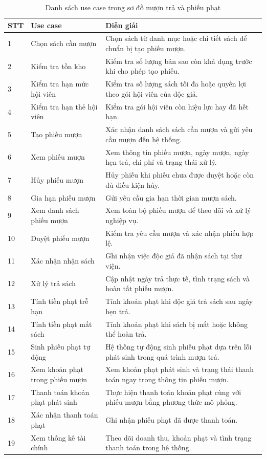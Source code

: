 \documentclass[../main.tex]{subfiles}
\begin{document}
\begin{longtable}{|p{1cm}|p{4cm}|p{8cm}|}
\caption{Danh sách use case trong sơ đồ mượn trả và phiếu phạt}\\
\hline
\textbf{STT} & \textbf{Use case} & \textbf{Diễn giải} \\
\hline
1 & Chọn sách cần mượn & Chọn sách từ danh mục hoặc chi tiết sách để chuẩn bị tạo phiếu mượn. \\
\hline
2 & Kiểm tra tồn kho & Kiểm tra số lượng bản sao còn khả dụng trước khi cho phép tạo phiếu. \\
\hline
3 & Kiểm tra hạn mức hội viên & Kiểm tra số lượng sách tối đa hoặc quyền lợi theo gói hội viên của độc giả. \\
\hline
4 & Kiểm tra hạn thẻ hội viên & Kiểm tra gói hội viên còn hiệu lực hay đã hết hạn. \\
\hline
5 & Tạo phiếu mượn & Xác nhận danh sách sách cần mượn và gửi yêu cầu mượn đến hệ thống. \\
\hline
6 & Xem phiếu mượn & Xem thông tin phiếu mượn, ngày mượn, ngày hẹn trả, chi phí và trạng thái xử lý. \\
\hline
7 & Hủy phiếu mượn & Hủy phiếu khi phiếu chưa được duyệt hoặc còn đủ điều kiện hủy. \\
\hline
8 & Gia hạn phiếu mượn & Gửi yêu cầu gia hạn thời gian mượn sách. \\
\hline
9 & Xem danh sách phiếu mượn & Xem toàn bộ phiếu mượn để theo dõi và xử lý nghiệp vụ. \\
\hline
10 & Duyệt phiếu mượn & Kiểm tra yêu cầu mượn và xác nhận phiếu hợp lệ. \\
\hline
11 & Xác nhận nhận sách & Ghi nhận việc độc giả đã nhận sách tại thư viện. \\
\hline
12 & Xử lý trả sách & Cập nhật ngày trả thực tế, tình trạng sách và hoàn tất phiếu mượn. \\
\hline
13 & Tính tiền phạt trễ hạn & Tính khoản phạt khi độc giả trả sách sau ngày hẹn trả. \\
\hline
14 & Tính tiền phạt mất sách & Tính khoản phạt khi sách bị mất hoặc không thể hoàn trả. \\
\hline
15 & Sinh phiếu phạt tự động & Hệ thống tự động sinh phiếu phạt dựa trên lỗi phát sinh trong quá trình mượn trả. \\
\hline
16 & Xem khoản phạt trong phiếu mượn & Xem khoản phạt phát sinh và trạng thái thanh toán ngay trong thông tin phiếu mượn. \\
\hline
17 & Thanh toán khoản phạt phát sinh & Thực hiện thanh toán khoản phạt cùng với phiếu mượn bằng phương thức mô phỏng. \\
\hline
18 & Xác nhận thanh toán phạt & Ghi nhận phiếu phạt đã được thanh toán. \\
\hline
19 & Xem thống kê tài chính & Theo dõi doanh thu, khoản phạt và tình trạng thanh toán trong hệ thống. \\
\hline
\end{longtable}
\end{document}
